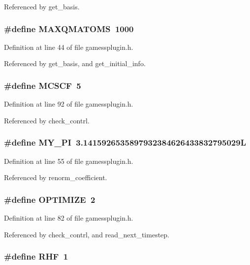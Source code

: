 Referenced by get\_\-basis.
\subsubsection{\setlength{\rightskip}{0pt plus 5cm}\#define MAXQMATOMS\ 1000}\label{gamessplugin_8h_a0}




Definition at line 44 of file gamessplugin.h.

Referenced by get\_\-basis, and get\_\-initial\_\-info.
\subsubsection{\setlength{\rightskip}{0pt plus 5cm}\#define MCSCF\ 5}\label{gamessplugin_8h_a16}




Definition at line 92 of file gamessplugin.h.

Referenced by check\_\-contrl.
\subsubsection{\setlength{\rightskip}{0pt plus 5cm}\#define MY\_\-PI\ 3.1415926535897932384626433832795029L}\label{gamessplugin_8h_a2}




Definition at line 55 of file gamessplugin.h.

Referenced by renorm\_\-coefficient.
\subsubsection{\setlength{\rightskip}{0pt plus 5cm}\#define OPTIMIZE\ 2}\label{gamessplugin_8h_a9}




Definition at line 82 of file gamessplugin.h.

Referenced by check\_\-contrl, and read\_\-next\_\-timestep.
\subsubsection{\setlength{\rightskip}{0pt plus 5cm}\#define RHF\ 1}\label{gamessplugin_8h_a12}




